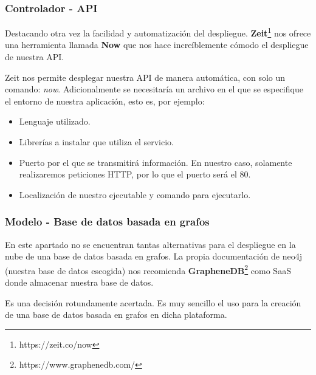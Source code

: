 \subsubsection{Controlador - API}

Destacando otra vez la facilidad y automatización del despliegue. \textbf{Zeit}\footnote{https://zeit.co/now} nos ofrece una herramienta llamada \textbf{Now} que nos hace increíblemente cómodo el despliegue de nuestra API.

Zeit nos permite desplegar nuestra API de manera automática, con solo un comando: \textit{now}. Adicionalmente se necesitaría un archivo en el que se especifique el entorno de nuestra aplicación, esto es, por ejemplo:

\begin{itemize}
    \item Lenguaje utilizado.
    \item Librerías a instalar que utiliza el servicio.
    \item Puerto por el que se transmitirá información. En nuestro caso, solamente realizaremos peticiones HTTP, por lo que el puerto será el 80.
    \item Localización de nuestro ejecutable y comando para ejecutarlo.
\end{itemize}

\subsubsection{Modelo - Base de datos basada en grafos}

En este apartado no se encuentran tantas alternativas para el despliegue en la nube de una base de datos basada en grafos. La propia documentación de neo4j (nuestra base de datos escogida) nos recomienda \textbf{GrapheneDB}\footnote{https://www.graphenedb.com/} como SaaS donde almacenar nuestra base de datos.

Es una decisión rotundamente acertada. Es muy sencillo el uso para la creación de una base de datos basada en grafos en dicha plataforma.